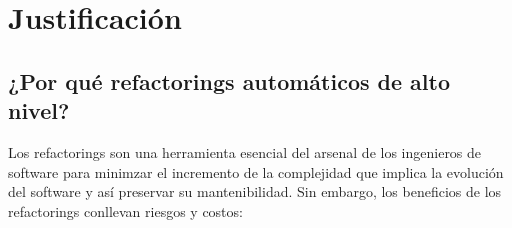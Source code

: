 \section{Justificación}
\subsection{¿Por qué refactorings automáticos de alto nivel?}

Los refactorings son una herramienta esencial del arsenal de los ingenieros de
software para minimzar el incremento de la complejidad que implica la evolución
del software y así preservar su mantenibilidad. Sin embargo, los
beneficios de los refactorings conllevan riesgos y costos:

